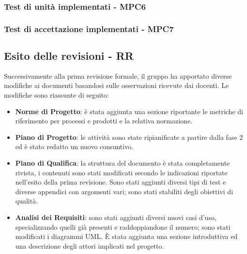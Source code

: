 \subsubsection{Test di unità implementati - MPC6}

\subsubsection{Test di accettazione implementati - MPC7}

\subsection{Esito delle revisioni - RR}
Successivamente alla prima revisione formale, il gruppo ha apportato diverse modifiche ai documenti basandosi sulle osservazioni ricevute dai docenti. Le modifiche sono riassunte di seguito:
	\begin{itemize}
		\item \textbf{Norme di Progetto}: è stata aggiunta una sezione riportante le metriche di riferimento per processi e prodotti e la relativa normazione. 
		\item \textbf{Piano di Progetto}: le attività sono state ripianificate a partire dalla fase 2 ed è stato redatto un nuovo consuntivo.
		\item \textbf{Piano di Qualifica}: la struttura del documento è stata completamente rivista, i contenuti sono stati modificati secondo le indicazioni riportate nell'esito della prima revisione. Sono stati aggiunti diversi tipi di test e diverse appendici con argomenti vari; sono stati stabiliti degli obiettivi di qualità.
		\item \textbf{Analisi dei Requisiti}: sono stati aggiunti diversi nuovi casi d'uso, specializzando quelli già presenti e raddoppiandone il numero; sono stati modificati i diagrammi UML. \`E stata aggiunta una sezione introduttiva ed una descrizione degli attori implicati nel progetto. 
	\end{itemize}


